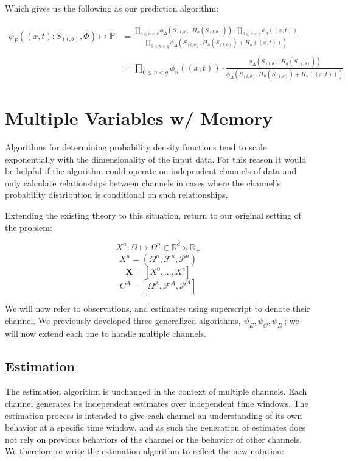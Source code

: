 \documentclass[10pt]{article}
\begin{document}
Which gives us the following as our prediction algorithm:

\begin{align}
\psi_P \left( (x,t) :S_{(t,\theta)}, \Phi \right) \mapsto \mathbb{P} 
	&= \frac{ \prod_{0 \le n < q} \phi_\Delta \left( S_{(t,\theta)}, H_n(S_{(t,\theta)}) \right) \cdot \prod_{0 \le n < q} \phi_n \left( (x,t) \right) }{ \prod_{0 \le n < q} \phi_\Delta(S_{(t,\theta)}, H_n(S_{(t,\theta)}) + H_n((x,t)) ) }  \nonumber \\
\nonumber \\
&= \prod_{0 \le n < q} \phi_n \left( (x,t) \right) \cdot \frac{ \phi_\Delta \left (S_{(t,\theta)}, H_n(S_{(t,\theta)}) \right) }{ \phi_\Delta \left( S_{(t,\theta)}, H_n(S_{(t,\theta)}) + H_n((x,t)) \right) }
\end{align}


\section{Multiple Variables w/ Memory}
Algorithms for determining probability density functions tend to scale exponentially with the dimensionality of the input data.  For this reason it would be helpful if the algorithm could operate on independent channels of data and only calculate relationships between channels in cases where the channel's probability distribution is conditional on such relationships.

Extending the existing theory to this situation, return to our original setting of the problem:

\[ X^n : \Omega \mapsto \Omega^n \in \mathbb{R}^d \times \mathbb{R}_+ \]
\[ X^n = (\Omega^n,\mathcal{F}^n,\mathcal{P}^n) \]
\[ \mathbf{X} = [X^0,...,X^c]   \]
\[ C^A = [\Omega^A,\mathcal{F}^A,\mathcal{P}^A] \]


We will now refer to observations, and estimates using superscript to denote their channel.  We previously developed three generalized algorithms, \(\psi_E, \psi_C, \psi_D \,\!\); we will now extend each one to handle multiple channels.

\subsection{Estimation}
The estimation algorithm is unchanged in the context of multiple channels.  Each channel generates its independent estimates over independent time windows.  The estimation process is intended to give each channel an understanding of its own behavior at a specific time window, and as such the generation of estimates does not rely on previous behaviors of the channel or the behavior of other channels.  We therefore re-write the estimation algorithm to reflect the new notation:
\end{document}
